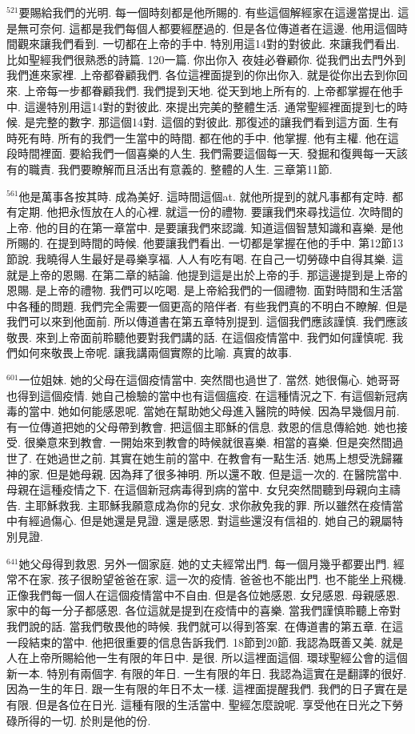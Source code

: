\documentclass{book}
\begin{document}
$^{521}$要賜給我們的光明.
每一個時刻都是他所賜的.
有些這個解經家在這邊當提出.
這是無可奈何.
這都是我們每個人都要經歷過的.
但是各位傳道者在這邊.
他用這個時間觀來讓我們看到.
一切都在上帝的手中.
特別用這14對的對彼此.
來讓我們看出.
比如聖經我們很熟悉的詩篇.
120一篇.
你出你入 夜娃必眷顧你.
從我們出去門外到我們進來家裡.
上帝都眷顧我們.
各位這裡面提到的你出你入.
就是從你出去到你回來.
上帝每一步都眷顧我們.
我們提到天地.
從天到地上所有的.
上帝都掌握在他手中.
這邊特別用這14對的對彼此.
來提出完美的整體生活.
通常聖經裡面提到七的時候.
是完整的數字.
那這個14對.
這個的對彼此.
那復述的讓我們看到這方面.
生有時死有時.
所有的我們一生當中的時間.
都在他的手中.
他掌握.
他有主權.
他在這段時間裡面.
要給我們一個喜樂的人生.
我們需要這個每一天.
發掘和復興每一天該有的職責.
我們要瞭解而且活出有意義的.
整體的人生.
三章第11節.

$^{561}$他是萬事各按其時.
成為美好.
這時間這個at.
就他所提到的就凡事都有定時.
都有定期.
他把永恆放在人的心裡.
就這一份的禮物.
要讓我們來尋找這位.
次時間的上帝.
他的目的在第一章當中.
是要讓我們來認識.
知道這個智慧知識和喜樂.
是他所賜的.
在提到時間的時候.
他要讓我們看出.
一切都是掌握在他的手中.
第12節13節說.
我曉得人生最好是尋樂享福.
人人有吃有喝.
在自己一切勞碌中自得其樂.
這就是上帝的恩賜.
在第二章的結論.
他提到這是出於上帝的手.
那這邊提到是上帝的恩賜.
是上帝的禮物.
我們可以吃喝.
是上帝給我們的一個禮物.
面對時間和生活當中各種的問題.
我們完全需要一個更高的陪伴者.
有些我們真的不明白不瞭解.
但是我們可以來到他面前.
所以傳道書在第五章特別提到.
這個我們應該謹慎.
我們應該敬畏.
來到上帝面前聆聽他要對我們講的話.
在這個疫情當中.
我們如何謹慎呢.
我們如何來敬畏上帝呢.
讓我講兩個實際的比喻.
真實的故事.

$^{601}$一位姐妹.
她的父母在這個疫情當中.
突然間也過世了.
當然.
她很傷心.
她哥哥也得到這個疫情.
她自己檢驗的當中也有這個瘟疫.
在這種情況之下.
有這個新冠病毒的當中.
她如何能感恩呢.
當她在幫助她父母進入醫院的時候.
因為早幾個月前.
有一位傳道把她的父母帶到教會.
把這個主耶穌的信息.
救恩的信息傳給她.
她也接受.
很樂意來到教會.
一開始來到教會的時候就很喜樂.
相當的喜樂.
但是突然間過世了.
在她過世之前.
其實在她生前的當中.
在教會有一點生活.
她馬上想受洗歸羅神的家.
但是她母親.
因為拜了很多神明.
所以還不敢.
但是這一次的.
在醫院當中.
母親在這種疫情之下.
在這個新冠病毒得到病的當中.
女兒突然間聽到母親向主禱告.
主耶穌救我.
主耶穌我願意成為你的兒女.
求你赦免我的罪.
所以雖然在疫情當中有經過傷心.
但是她還是見證.
還是感恩.
對這些還沒有信祖的.
她自己的親屬特別見證.

$^{641}$她父母得到救恩.
另外一個家庭.
她的丈夫經常出門.
每一個月幾乎都要出門.
經常不在家.
孩子很盼望爸爸在家.
這一次的疫情.
爸爸也不能出門.
也不能坐上飛機.
正像我們每一個人在這個疫情當中不自由.
但是各位她感恩.
女兒感恩.
母親感恩.
家中的每一分子都感恩.
各位這就是提到在疫情中的喜樂.
當我們謹慎聆聽上帝對我們說的話.
當我們敬畏他的時候.
我們就可以得到答案.
在傳道書的第五章.
在這一段結束的當中.
他把很重要的信息告訴我們.
18節到20節.
我認為既善又美.
就是人在上帝所賜給他一生有限的年日中.
是很.
所以這裡面這個.
環球聖經公會的這個新一本.
特別有兩個字.
有限的年日.
一生有限的年日.
我認為這實在是翻譯的很好.
因為一生的年日.
跟一生有限的年日不太一樣.
這裡面提醒我們.
我們的日子實在是有限.
但是各位在日光.
這種有限的生活當中.
聖經怎麼說呢.
享受他在日光之下勞碌所得的一切.
於則是他的份.
\end{document}
